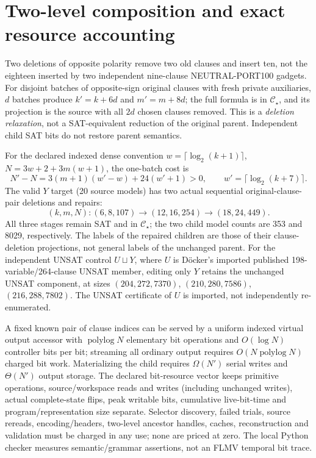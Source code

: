 \documentclass[11pt]{article}
\begin{document}
\section{Two-level composition and exact resource accounting}
Two deletions of opposite polarity remove two old clauses and insert ten, not the eighteen inserted by two independent nine-clause NEUTRAL-PORT100 gadgets. For disjoint batches of opposite-sign original clauses with fresh private auxiliaries, $d$ batches produce $k'=k+6d$ and $m'=m+8d$; the full formula is in $\mathcal C_\star$, and its projection is the source with all $2d$ chosen clauses removed. This is a \emph{deletion relaxation}, not a SAT-equivalent reduction of the original parent. Independent child SAT bits do not restore parent semantics.

For the declared indexed dense convention $w=\lceil\log_2(k+1)\rceil$, $N=3w+2+3m(w+1)$, the one-batch cost is
\[
N'-N=3(m+1)(w'-w)+24(w'+1)>0,\qquad w'=\lceil\log_2(k+7)\rceil.
\]
The valid $Y$ target (20 source models) has two actual sequential original-clause-pair deletions and repairs:
\[
(k,m,N): (6,8,107)\longrightarrow (12,16,254)
\longrightarrow(18,24,449).
\]
All three stages remain SAT and in $\mathcal C_\star$; the two child model counts are 353 and 8029, respectively. The labels of the repaired children are those of their clause-deletion projections, not general labels of the unchanged parent. For the independent UNSAT control $U\sqcup Y$, where $U$ is D\"ocker's imported published 198-variable/264-clause UNSAT member, editing only $Y$ retains the unchanged UNSAT component, at sizes $(204,272,7370)$, $(210,280,7586)$, $(216,288,7802)$. The UNSAT certificate of $U$ is imported, not independently re-enumerated.

A fixed known pair of clause indices can be served by a uniform indexed virtual output accessor with $\operatorname{polylog}N$ elementary bit operations and $O(\log N)$ controller bits per bit; streaming all ordinary output requires $O(N\operatorname{polylog}N)$ charged bit work. Materializing the child requires $\Omega(N')$ serial writes and $\Theta(N')$ output storage. The declared bit-resource vector keeps primitive operations, source/workspace reads and writes (including unchanged writes), actual complete-state flips, peak writable bits, cumulative live-bit-time and program/representation size separate. Selector discovery, failed trials, source rereads, encoding/headers, two-level ancestor handles, caches, reconstruction and validation must be charged in any use; none are priced at zero. The local Python checker measures semantic/grammar assertions, not an FLMV temporal bit trace.
\end{document}

